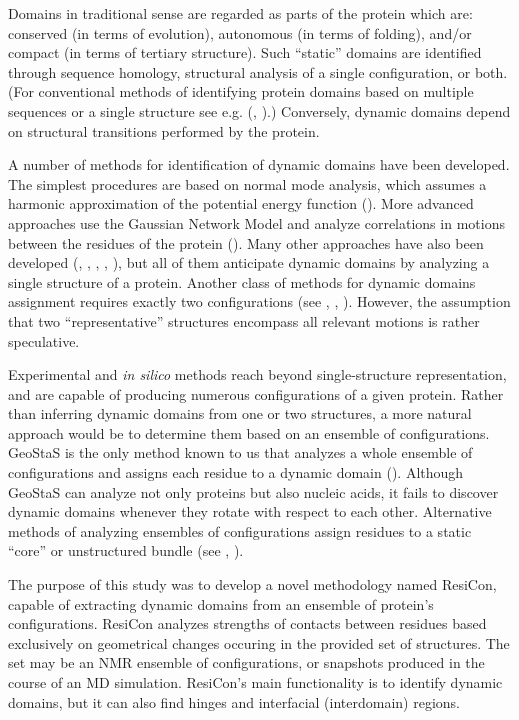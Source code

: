 Domains in traditional sense are regarded as parts of the protein which are: conserved (in terms of evolution), autonomous (in terms of folding), and/or compact (in terms of tertiary structure).
Such ``static'' domains are identified through sequence homology, structural analysis of a single configuration, or both.
(For conventional methods of identifying protein domains based on multiple sequences or a single structure see e.g. (\cite{richardson1981anatomy}, \cite{bork1991shuffled}).)
Conversely, dynamic domains depend on structural transitions performed by the protein.

A number of methods for identification of dynamic domains have been developed.
The simplest procedures are based on normal mode analysis, which assumes a harmonic approximation of the potential energy function (\cite{hinsen1998analysis}).
More advanced approaches use the Gaussian Network Model and analyze correlations in motions between the residues of the protein (\cite{yesylevskyy2006dynamic}).
Many other approaches have also been developed (\cite{bahar1997direct}, \cite{wriggers1997protein}, \cite{bernhard2010optimal}, \cite{genoni2012identification}, \cite{potestio2009coarse}), but all of them anticipate dynamic domains by analyzing a single structure of a protein.
Another class of methods for dynamic domains assignment requires exactly two configurations (see \cite{hayward1998systematic}, \cite{lee2003dyndom}, \cite{ye2003flexible}).
However, the assumption that two ``representative'' structures encompass all relevant motions is rather speculative.

Experimental and \emph{in silico} methods reach beyond single-structure representation, and are capable of producing numerous configurations of a given protein.
Rather than inferring dynamic domains from one or two structures, a more natural approach would be to determine them based on an ensemble of configurations.
GeoStaS is the only method known to us that analyzes a whole ensemble of configurations and assigns each residue to a dynamic domain (\cite{romanowska2012determining}).
Although GeoStaS can analyze not only proteins but also nucleic acids, it fails to discover dynamic domains whenever they rotate with respect to each other.
Alternative methods of analyzing ensembles of configurations assign residues to a static ``core'' or unstructured bundle (see \cite{snyder2005clustering}, \cite{kirchner2011objective}).

The purpose of this study was to develop a novel methodology named ResiCon, capable of extracting dynamic domains from an ensemble of protein's configurations.
ResiCon analyzes strengths of contacts between residues based exclusively on geometrical changes occuring in the provided set of structures.
The set may be an NMR ensemble of configurations, or snapshots produced in the course of an MD simulation.
ResiCon's main functionality is to identify dynamic domains, but it can also find hinges and interfacial (interdomain) regions.

